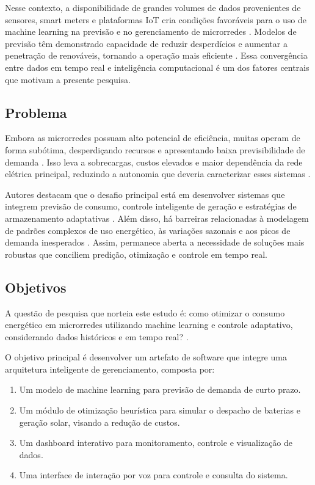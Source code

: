 \documentclass[conference]{IEEEtran}
\begin{document}
Nesse contexto, a disponibilidade de grandes volumes de dados provenientes de sensores, smart meters e plataformas IoT cria condições favoráveis para o uso de machine learning na previsão e no gerenciamento de microrredes \cite{3}. Modelos de previsão têm demonstrado capacidade de reduzir desperdícios e aumentar a penetração de renováveis, tornando a operação mais eficiente \cite{4}. Essa convergência entre dados em tempo real e inteligência computacional é um dos fatores centrais que motivam a presente pesquisa.

\subsection{Problema}
Embora as microrredes possuam alto potencial de eficiência, muitas operam de forma subótima, desperdiçando recursos e apresentando baixa previsibilidade de demanda \cite{5}. Isso leva a sobrecargas, custos elevados e maior dependência da rede elétrica principal, reduzindo a autonomia que deveria caracterizar esses sistemas \cite{6}.

Autores destacam que o desafio principal está em desenvolver sistemas que integrem previsão de consumo, controle inteligente de geração e estratégias de armazenamento adaptativas \cite{7}. Além disso, há barreiras relacionadas à modelagem de padrões complexos de uso energético, às variações sazonais e aos picos de demanda inesperados \cite{8}. Assim, permanece aberta a necessidade de soluções mais robustas que conciliem predição, otimização e controle em tempo real.

\subsection{Objetivos}
A questão de pesquisa que norteia este estudo é: como otimizar o consumo energético em microrredes utilizando machine learning e controle adaptativo, considerando dados históricos e em tempo real? \cite{1}.

O objetivo principal é desenvolver um artefato de software que integre uma arquitetura inteligente de gerenciamento, composta por:
\begin{enumerate}
    \item Um modelo de machine learning para previsão de demanda de curto prazo.
    \item Um módulo de otimização heurística para simular o despacho de baterias e geração solar, visando a redução de custos.
    \item Um dashboard interativo para monitoramento, controle e visualização de dados.
    \item Uma interface de interação por voz para controle e consulta do sistema.
\end{enumerate}
\end{document}
